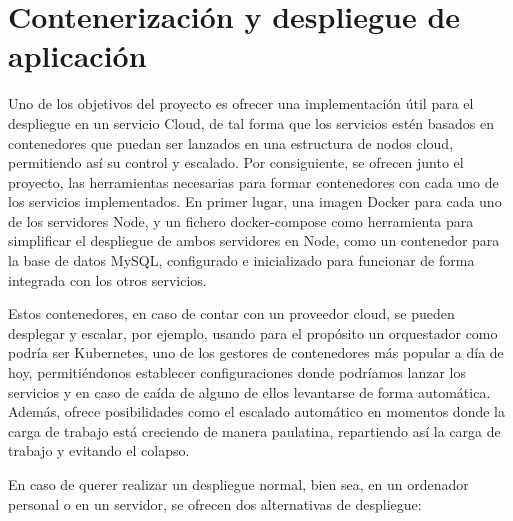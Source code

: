 \section{Contenerización y despliegue de aplicación}

Uno de los objetivos del proyecto es ofrecer una implementación útil para
el despliegue en un servicio Cloud, de tal forma que los servicios estén
basados en contenedores que puedan ser lanzados en una estructura de nodos
cloud, permitiendo así su control y escalado. Por consiguiente, se ofrecen
junto el proyecto, las herramientas necesarias para formar contenedores con
cada uno de los servicios implementados. En primer lugar, una imagen Docker
para cada uno de los servidores Node, y un fichero docker-compose como
herramienta para simplificar el despliegue de ambos servidores en
Node, como un contenedor para la base de datos MySQL, configurado e
inicializado para funcionar de forma integrada con los otros servicios.

Estos contenedores, en caso de contar con un proveedor cloud, se pueden
desplegar y escalar, por ejemplo, usando para el propósito un orquestador
como podría ser Kubernetes, uno de los gestores de contenedores más popular
a día de hoy, permitiéndonos establecer configuraciones donde podríamos
lanzar los servicios y en caso de caída de alguno de ellos levantarse de
forma automática. Además, ofrece posibilidades como el escalado automático
en momentos donde la carga de trabajo está creciendo de manera paulatina,
repartiendo así la carga de trabajo y evitando el colapso.


En caso de querer realizar un despliegue normal, bien sea, en un ordenador
personal o en un servidor, se ofrecen dos alternativas de despliegue:

